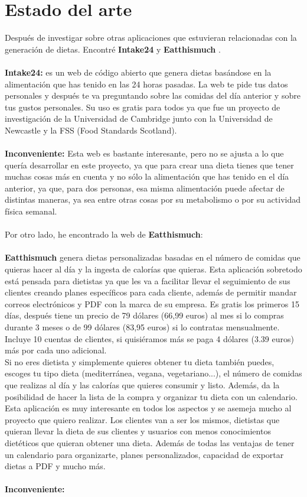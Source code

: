 \chapter{Estado del arte} \label{sec:estado_del_arte}

Después de investigar sobre otras aplicaciones que estuvieran relacionadas con la generación de dietas. Encontré \textbf{Intake24} \cite{Intake24} y \textbf{Eatthismuch} \cite{Eatthismuch}. 
\\\\
\textbf{Intake24:} es un web de código abierto que genera dietas basándose en la alimentación que has tenido en las 24 horas pasadas.
La web te pide tus datos personales y después te va preguntando sobre las comidas del día anterior y sobre tus gustos personales.
Su uso es gratis para todos ya que fue un proyecto de investigación de la Universidad de Cambridge junto con la Universidad de Newcastle y 
la FSS (Food Standards Scotland).
\\\\
\textbf{Inconveniente:}
Esta web es bastante interesante, pero no se ajusta a lo que quería desarrollar en este proyecto, ya que para crear una dieta tienes que tener muchas cosas más en cuenta y no sólo
la alimentación que has tenido en el día anterior, ya que, para dos personas, esa misma alimentación puede afectar de distintas maneras,
ya sea entre otras cosas por su metabolismo o por su actividad física semanal.
\\\\
Por otro lado, he encontrado la web de \textbf{Eatthismuch}:
\\\\
\textbf{Eatthismuch} genera dietas personalizadas basadas en el número de comidas que quieras hacer al día y la ingesta de calorías que quieras.
Esta aplicación sobretodo está pensada para dietistas ya que les va a facilitar llevar el seguimiento de sus clientes creando planes específicos
para cada cliente, además de permitir mandar correos electrónicos y PDF con la marca de su empresa.
Es gratis los primeros 15 días, después tiene un precio de 79 dólares (66,99 euros) al mes si lo compras durante 3 meses o de 99 dólares (83,95 euros) si lo contratas mensualmente.
Incluye 10 cuentas de clientes, si quisiéramos más se paga 4 dólares (3.39 euros) más por cada uno adicional.\\
Si no eres dietista y simplemente quieres obtener tu dieta también puedes, escoges tu tipo dieta (mediterránea, vegana, vegetariano...), el número de comidas que realizas al día y las calorías que quieres consumir y listo.
Además, da la posibilidad de hacer la lista de la compra y organizar tu dieta con un calendario.
Esta aplicación es muy interesante en todos los aspectos y se asemeja mucho al proyecto que quiero realizar. Los clientes van a ser los mismos, dietistas que quieran llevar la dieta de sus clientes
y usuarios con menos conocimientos dietéticos que quieran obtener una dieta. Además de todas las ventajas de tener un calendario para organizarte, planes personalizados, capacidad de exportar dietas a PDF y mucho más.
\\\\
\textbf{Inconveniente:}

